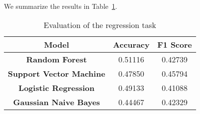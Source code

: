 We summarize the results in Table~\ref{tab:results-classification}.

\begin{table}
    \centering
    \begin{tabular}{|c|c|c|}
        \hline
        \textbf{Model} & \textbf{Accuracy} & \textbf{F1 Score} \\
        \hline
        \textbf{Random Forest} & 0.51116 & 0.42739 \\
        \hline
        \textbf{Support Vector Machine} & 0.47850 & 0.45794 \\
        \hline
        \textbf{Logistic Regression} & 0.49133 & 0.41088 \\
        \hline
        \textbf{Gaussian Naive Bayes} & 0.44467 & 0.42329 \\
        \hline
    \end{tabular}
    \caption{Evaluation of the regression task}
    \label{tab:results-classification}
\end{table}
